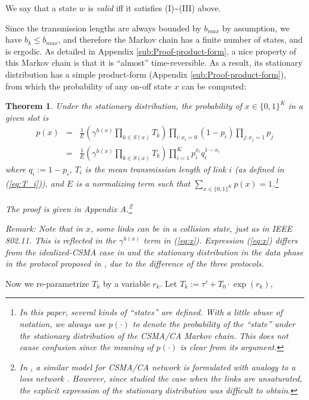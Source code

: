 \documentclass{IEEEtran}
\newtheorem{thm}{Theorem}
\begin{document}
We say that a state $w$ is \emph{valid} iff it satisfies (I)\textasciitilde{}(III)
above.

Since the transmission lengths are always bounded by $b_{max}$ by
assumption, we have $b_{k}\le b_{max}$, and therefore the Markov
chain has a finite number of states, and is ergodic. As detailed in
Appendix \ref{sub:Proof-product-form}, a nice property of this Markov
chain is that it is {}``almost'' time-reversible. As a result, its
stationary distribution has a simple product-form (Appendix \ref{sub:Proof-product-form}),
from which the probability of any on-off state $x$ can be computed:
\begin{thm}
\label{thm:state-distribution}Under the stationary distribution,
the probability of $x\in\{0,1\}^{K}$ in a given slot is \begin{eqnarray}
p(x) & = & \frac{1}{E}(\gamma^{h(x)}\prod_{k\in S(x)}T_{k})\prod_{i:x_{i}=0}(1-p_{i})\prod_{j:x_{j}=1}p_{j}\nonumber \\
 & = & \frac{1}{E}(\gamma^{h(x)}\prod_{k\in S(x)}T_{k})\prod_{i=1}^{K}p_{i}^{x_{i}}q_{i}^{1-x_{i}}\label{eq:x}\end{eqnarray}
where $q_{i}:=1-p_{i}$, $T_{i}$ is the mean transmission length
of link $i$ (as defined in (\ref{eq:T_i})), and $E$ is a normalizing
term such that $\sum_{x\in\{0,1\}^{K}}p(x)=1$.\footnote{In this paper, several kinds of {}``states'' are defined. With a
little abuse of notation, we always use $p(\cdot)$ to denote the
probability of the {}``state'' under the stationary distribution
of the CSMA/CA Markov chain. This does not cause confusion since the
meaning of $p(\cdot)$ is clear from its argument.}

The proof is given in Appendix A.\footnote{In \cite{asymptotic}, a similar model for CSMA/CA network is formulated
with analogy to a loss network \cite{loss_network}. However, since
\cite{asymptotic} studied the case when the links are unsaturated,
the explicit expression of the stationary distribution was difficult
to obtain.}

Remark: Note that in $x$, some links can be in a collision state,
just as in IEEE 802.11. This is reflected in the $\gamma^{h(x)}$
term in (\ref{eq:x}). Expression (\ref{eq:x}) differs from the idealized-CSMA
case in \cite{Allerton} and the stationary distribution in the data
phase in the protocol proposed in \cite{Jian}, due to the difference
of the three protocols.
\end{thm}
Now we re-parametrize $T_{k}$ by a variable $r_{k}$. Let $T_{k}:=\tau'+T_{0}\cdot\exp(r_{k})$,
\end{document}
